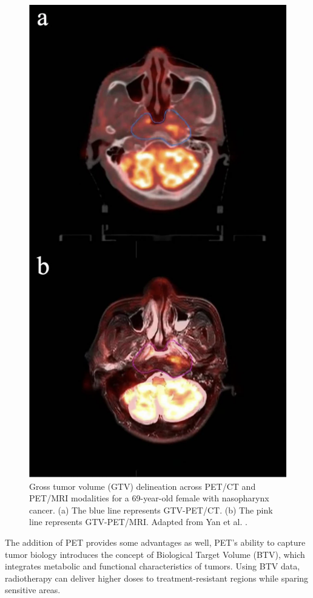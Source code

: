 \documentclass[11pt]{article} %
\begin{document}
\begin{multicols}{2}
\begin{figure}[H]
\centering
\includegraphics[width=0.8\columnwidth]{assets/GTV_Delineation_PETCT_vs_PETMRI.png} 
\caption{Gross tumor volume (GTV) delineation across PET/CT and PET/MRI modalities for a 69-year-old female with nasopharynx cancer. (a) The blue line represents GTV-PET/CT. (b) The pink line represents GTV-PET/MRI. Adapted from Yan et al. \cite{yan2024}.}
\label{fig:gtv_delineation_cropped}
\end{figure}

The addition of PET provides some advantages as well, PET’s ability to capture tumor biology introduces the concept of Biological Target Volume (BTV), which integrates metabolic and functional characteristics of tumors. Using BTV data, radiotherapy can deliver higher doses to treatment-resistant regions while sparing sensitive areas.


\end{multicols}
\end{document}
